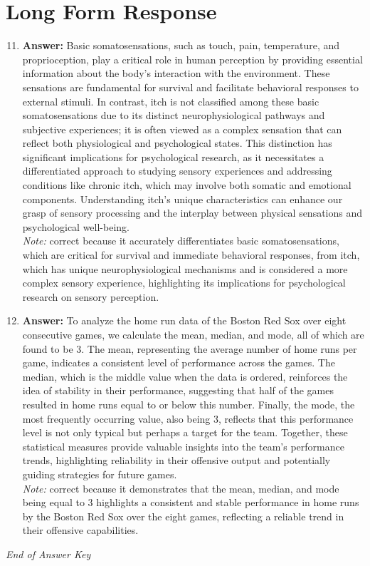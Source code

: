 \documentclass[12pt]{article}
\begin{document}
\section*{Long Form Response}
\begin{enumerate}[label=\arabic*.]
\setcounter{enumi}{10}
\item \textbf{Answer:} Basic somatosensations, such as touch, pain, temperature, and proprioception, play a critical role in human perception by providing essential information about the body's interaction with the environment. These sensations are fundamental for survival and facilitate behavioral responses to external stimuli. In contrast, itch is not classified among these basic somatosensations due to its distinct neurophysiological pathways and subjective experiences; it is often viewed as a complex sensation that can reflect both physiological and psychological states. This distinction has significant implications for psychological research, as it necessitates a differentiated approach to studying sensory experiences and addressing conditions like chronic itch, which may involve both somatic and emotional components. Understanding itch's unique characteristics can enhance our grasp of sensory processing and the interplay between physical sensations and psychological well-being.
\\ \textit{Note:} correct because it accurately differentiates basic somatosensations, which are critical for survival and immediate behavioral responses, from itch, which has unique neurophysiological mechanisms and is considered a more complex sensory experience, highlighting its implications for psychological research on sensory perception.
\item \textbf{Answer:} To analyze the home run data of the Boston Red Sox over eight consecutive games, we calculate the mean, median, and mode, all of which are found to be 3. The mean, representing the average number of home runs per game, indicates a consistent level of performance across the games. The median, which is the middle value when the data is ordered, reinforces the idea of stability in their performance, suggesting that half of the games resulted in home runs equal to or below this number. Finally, the mode, the most frequently occurring value, also being 3, reflects that this performance level is not only typical but perhaps a target for the team. Together, these statistical measures provide valuable insights into the team's performance trends, highlighting reliability in their offensive output and potentially guiding strategies for future games.
\\ \textit{Note:} correct because it demonstrates that the mean, median, and mode being equal to 3 highlights a consistent and stable performance in home runs by the Boston Red Sox over the eight games, reflecting a reliable trend in their offensive capabilities.
\end{enumerate}

\vfill
\noindent\textit{End of Answer Key}
\end{document}
